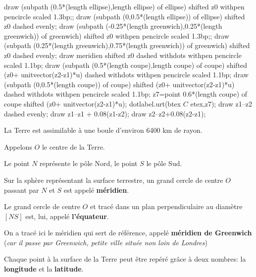\begin{changemargin}{-5mm}{-10mm}
\begin{definition}[Vocabulaire]
\begin{minipage}{0.35\linewidth}
\begin{center}
{\begin{Geometrie}
                    draw (subpath (0.5*(length ellipse),length ellipse) of ellipse) shifted z0 withpen pencircle scaled 1.3bp;;
                    draw (subpath (0,0.5*(length ellipse)) of ellipse) shifted z0 dashed evenly;
                    draw (subpath (-0.25*(length greenwich),0.25*(length greenwich)) of greenwich) shifted z0 withpen pencircle scaled 1.3bp;;
                    draw (subpath (0.25*(length greenwich),0.75*(length greenwich)) of greenwich) shifted z0 dashed evenly;                    
                    draw meridien shifted z0 dashed withdots withpen pencircle scaled 1.1bp;
                    draw (subpath (0.5*(length coupe),length coupe) of coupe) shifted (z0+ unitvector(z2-z1)*u) dashed withdots  withpen pencircle scaled 1.1bp;
                    draw (subpath (0,0.5*(length coupe)) of coupe) shifted (z0+ unitvector(z2-z1)*u) dashed withdots  withpen pencircle scaled 1.1bp;
                    z7=point 0.6*(length coupe) of coupe shifted (z0+ unitvector(z2-z1)*u);
                    dotlabel.urt(btex $C$ etex,z7);
                    draw z1--z2 dashed evenly;
                    draw z1--z1 + 0.08(z1-z2);
                    draw z2--z2+0.08(z2-z1);
                \end{Geometrie}
            }
        \end{center}
    \end{minipage}
    \hfill
    \begin{minipage}{0.65\linewidth}
        La Terre est assimilable à une boule d'environ 6400 km de rayon.

        Appelons $O$ le centre de la Terre.
        
        Le point $N$ représente le pôle Nord, le point $S$ le pôle Sud.

        Sur la sphère représentant la surface terrestre, un grand cercle de centre $O$ passant par $N$ et $S$ est appelé \textbf{méridien}.

        Le grand cercle de centre $O$ et tracé dans un plan perpendiculaire au diamètre $[NS]$ est, lui, appelé \textbf{l'équateur}.

        On a tracé ici le méridien qui sert de référence, appelé \textbf{méridien de Greenwich} (\textit{car il passe par Greenwich, petite ville située non loin de Londres})

        Chaque point à la surface de la Terre peut être repéré grâce à deux nombres: la \textbf{longitude} et la \textbf{latitude}.


\end{minipage}
\end{definition}
\end{changemargin}
